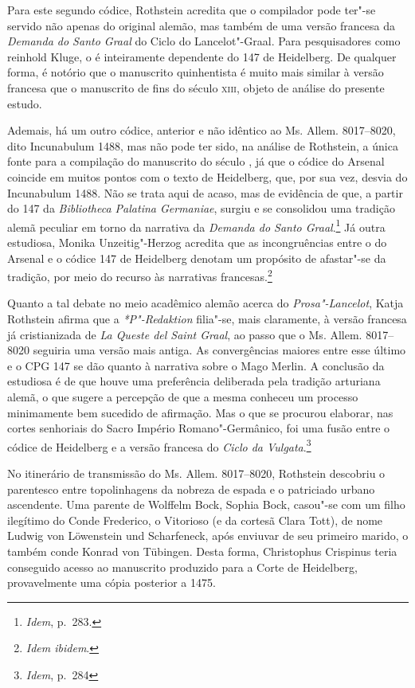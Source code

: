 Para este segundo códice, Rothstein acredita que o compilador pode ter"-se
servido não apenas do original alemão, mas também de uma versão francesa da
\textit{Demanda do Santo Graal} do Ciclo do Lancelot"-Graal. Para pesquisadores
como reinhold Kluge, o  é inteiramente dependente do  147 de Heidelberg.
De qualquer forma, é notório que o manuscrito quinhentista é muito mais similar
à versão francesa que o manuscrito de fins do século \textsc{xiii}, objeto de
análise do presente estudo.

Ademais, há um outro códice, anterior e não idêntico ao Ms. Allem. 8017--8020,
dito Incunabulum 1488, mas não pode ter sido, na análise de Rothstein, a única
fonte para a compilação do manuscrito do século , já que o códice do
Arsenal coincide em muitos pontos com o texto de Heidelberg, que, por sua vez,
desvia do Incunabulum 1488. Não se trata aqui de acaso, mas de evidência de que,
a partir do  147 da \textit{Bibliotheca Palatina Germaniae}, surgiu e se
consolidou uma tradição alemã peculiar em torno da narrativa da \textit{Demanda
do Santo Graal}.\footnote{ \textit{Idem}, p.~283. } Já outra estudiosa, Monika
Unzeitig"-Herzog acredita que as incongruências entre o  do Arsenal e o
códice 147 de Heidelberg denotam um propósito de afastar"-se da tradição, por
meio do recurso às narrativas francesas.\footnote{ \textit{Idem ibidem}. }

Quanto a tal debate no meio acadêmico alemão acerca do \textit{Prosa"-Lancelot},
Katja Rothstein afirma que a \textit{*P"-Redaktion} filia"-se, mais claramente, à
versão francesa já cristianizada de \textit{La Queste del Saint Graal}, ao passo
que o Ms. Allem. 8017--8020 seguiria uma versão mais antiga. As convergências
maiores entre esse último e o CPG 147 se dão quanto à narrativa sobre o Mago
Merlin. A conclusão da estudiosa é de que houve uma preferência deliberada pela
tradição arturiana alemã, o que sugere a percepção de que a mesma conheceu um
processo minimamente bem sucedido de afirmação. Mas o que se procurou elaborar,
nas cortes senhoriais do Sacro Império Romano"-Germânico, foi uma fusão entre o
códice de Heidelberg e a versão francesa do \textit{Ciclo da Vulgata}.\footnote{
\textit{Idem}, p.~284 }

No itinerário de transmissão do Ms. Allem. 8017--8020, Rothstein descobriu o
parentesco entre topolinhagens da nobreza de espada e o patriciado urbano
ascendente.
Uma parente de Wolffelm Bock, Sophia Bock, casou"-se com um filho ilegítimo do
Conde Frederico, o Vitorioso (e da cortesã Clara Tott), de nome Ludwig von
Löwenstein und Scharfeneck, após enviuvar de seu primeiro marido, o também conde
Konrad  von Tübingen. Desta forma, Christophus Crispinus teria
conseguido acesso ao manuscrito produzido para a Corte de Heidelberg,
provavelmente uma cópia posterior a 1475.

